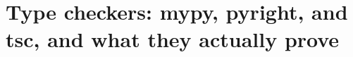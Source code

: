 \chapter{Type checkers: mypy, pyright, and tsc, and what they actually prove}
\label{ch:type-checkers-mypy-pyright-and-tsc-and}

